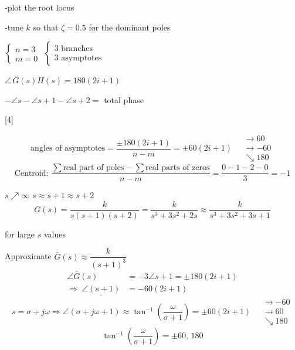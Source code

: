 \documentclass[11pt,a4paper]{article}
\begin{document}
\noindent
\begin{minipage}[t]{0.5\linewidth}
-plot the root locus

-tune $k$ so that $\zeta=0.5$ for the dominant poles

\medskip
$\left\{\begin{array}{l} n=3 \\ m=0 \end{array}\right.$ \qquad $\left\{\begin{array}{l} \text{3 branches} \\ \text{3 asymptotes} \end{array}\right.$
\end{minipage}\hfill
\begin{minipage}[t]{0.46\linewidth}
\textcolor{kirmizikalem}{$\angle\, G(s)H(s)=180(2i+1)$}

\textcolor{kirmizikalem}{$-\angle s-\angle s{+}1-\angle s{+}2=$ total phase}
\end{minipage}

[4]

\[ \text{angles of asymptotes} = \frac{\pm180(2i+1)}{n-m} = \pm60(2i+1)
   \quad \begin{array}{l} \to 60 \\ \to -60 \\ \searrow 180 \end{array} \]
\[ \text{Centroid: } \frac{\sum\text{real part of poles}-\sum\text{real parts of zeros}}{n-m} = \frac{0-1-2-0}{3} = -1 \]

$s\nearrow\infty$ \qquad $s\approx s+1\approx s+2$
\[ G(s)=\frac{k}{s(s+1)(s+2)} = \frac{k}{s^3+3s^2+2s} \approx \frac{k}{s^3+3s^2+3s+1} \]

for large $s$ values

Approximate \quad $\bar{G}(s)\approx\dfrac{k}{(s+1)^3}$
\[\begin{aligned}
 \angle\bar{G}(s) &= -3\angle s{+}1 = \pm180(2i+1) \\
 \Rightarrow\ \underline{\angle(s{+}1)} &= -60(2i+1)
\end{aligned}\]
\[ s=\sigma+j\omega \Rightarrow \angle(\sigma+j\omega+1) \approx \tan^{-1}\!\left(\frac{\omega}{\sigma+1}\right) = \pm60(2i+1)
   \quad \begin{array}{l} \to -60 \\ \to 60 \\ \searrow 180 \end{array} \]
\[ \tan^{-1}\!\left(\frac{\omega}{\sigma+1}\right)=\pm60,\,180 \]
\end{document}
